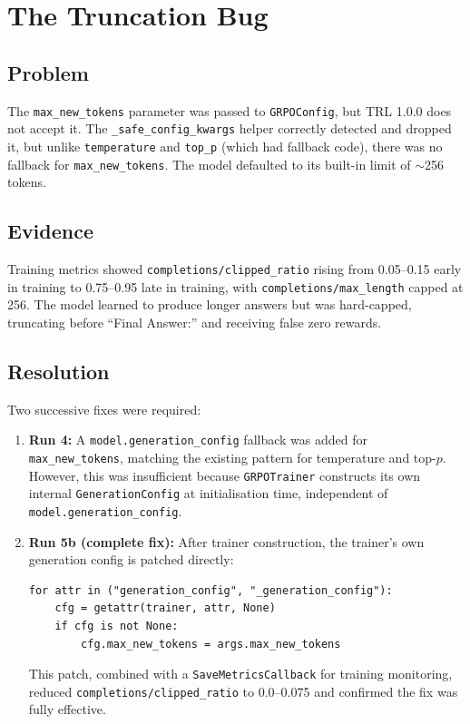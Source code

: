 \documentclass[12pt]{report}
\begin{document}
\section{The Truncation Bug}

\subsection{Problem}

The \texttt{max\_new\_tokens} parameter was passed to \texttt{GRPOConfig}, but TRL 1.0.0 does not accept it. The \texttt{\_safe\_config\_kwargs} helper correctly detected and dropped it, but unlike \texttt{temperature} and \texttt{top\_p} (which had fallback code), there was no fallback for \texttt{max\_new\_tokens}. The model defaulted to its built-in limit of $\sim$256 tokens.

\subsection{Evidence}

Training metrics showed \texttt{completions/\allowbreak clipped\_ratio} rising from 0.05--0.15 early in training to 0.75--0.95 late in training, with \texttt{completions/\allowbreak max\_length} capped at 256. The model learned to produce longer answers but was hard-capped, truncating before ``Final Answer:'' and receiving false zero rewards.

\subsection{Resolution}

Two successive fixes were required:

\begin{enumerate}
    \item \textbf{Run 4:} A \texttt{model.generation\_config} fallback was added for \texttt{max\_new\_tokens}, matching the existing pattern for temperature and top-$p$. However, this was insufficient because \texttt{GRPOTrainer} constructs its own internal \texttt{GenerationConfig} at initialisation time, independent of \texttt{model.generation\_config}.
    
    \item \textbf{Run 5b (complete fix):} After trainer construction, the trainer's own generation config is patched directly:
\begin{verbatim}
for attr in ("generation_config", "_generation_config"):
    cfg = getattr(trainer, attr, None)
    if cfg is not None:
        cfg.max_new_tokens = args.max_new_tokens
\end{verbatim}
    This patch, combined with a \texttt{SaveMetricsCallback} for training monitoring, reduced \texttt{completions/\allowbreak clipped\_ratio} to 0.0--0.075 and confirmed the fix was fully effective.
\end{enumerate}
\end{document}
